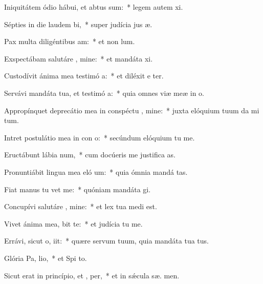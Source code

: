\item Iniquitátem ódio hábui, et abtus sum:~* legem autem  xi.
\item Sépties in die laudem  bi,~* super judícia jus æ.
\item Pax multa diligéntibus  am:~* et non   lum.
\item Exspectábam salutáre , mine:~* et mandáta  xi.
\item Custodívit ánima mea testimó a:~* et diléxit e ter.
\item Servávi mandáta tua, et testimó a:~* quia omnes viæ meæ in  o.
\item Appropínquet deprecátio mea in conspéctu , mine:~* juxta elóquium tuum da mi tum.
\item Intret postulátio mea in con o:~* secúndum elóquium tu  me.
\item Eructábunt lábia  num,~* cum docúeris me justifica as.
\item Pronuntiábit lingua mea eló um:~* quia ómnia mandá  tas.
\item Fiat manus tu  vet me:~* quóniam mandáta  gi.
\item Concupívi salutáre , mine:~* et lex tua medi  est.
\item Vivet ánima mea,  bit te:~* et judícia tu  me.
\item Errávi, sicut o,  iit:~* quære servum tuum, quia mandáta tua   tus.
\item Glória Pa,  lio,~* et Spi to.
\item Sicut erat in princípio, et ,  per,~* et in sǽcula sæ. men.
